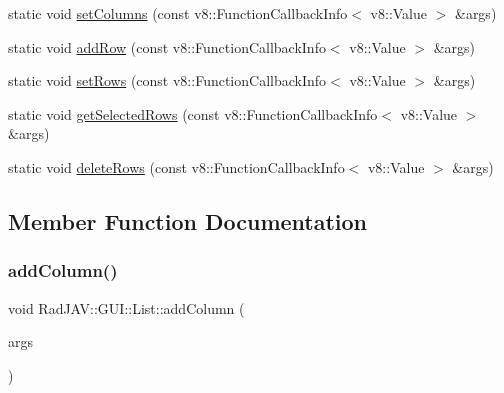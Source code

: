 \begin{DoxyCompactItemize}
\item 
static void \mbox{\hyperlink{class_rad_j_a_v_1_1_g_u_i_1_1_list_a08bfc85f458f12eee971170e09b058d3}{set\+Columns}} (const v8\+::\+Function\+Callback\+Info$<$ v8\+::\+Value $>$ \&args)
\item 
static void \mbox{\hyperlink{class_rad_j_a_v_1_1_g_u_i_1_1_list_a806e1664d1464c23473f8e208d86940f}{add\+Row}} (const v8\+::\+Function\+Callback\+Info$<$ v8\+::\+Value $>$ \&args)
\item 
static void \mbox{\hyperlink{class_rad_j_a_v_1_1_g_u_i_1_1_list_a9451ae633e7a9b6bcd540855dc2cd7a6}{set\+Rows}} (const v8\+::\+Function\+Callback\+Info$<$ v8\+::\+Value $>$ \&args)
\item 
static void \mbox{\hyperlink{class_rad_j_a_v_1_1_g_u_i_1_1_list_ab5d92eaa4a3192061741e716f2ee2423}{get\+Selected\+Rows}} (const v8\+::\+Function\+Callback\+Info$<$ v8\+::\+Value $>$ \&args)
\item 
static void \mbox{\hyperlink{class_rad_j_a_v_1_1_g_u_i_1_1_list_a04ae9b8476cf076d25e26b2c0829e340}{delete\+Rows}} (const v8\+::\+Function\+Callback\+Info$<$ v8\+::\+Value $>$ \&args)
\end{DoxyCompactItemize}


\subsection{Member Function Documentation}
\mbox{\label{class_rad_j_a_v_1_1_g_u_i_1_1_list_a2c36615fa8c05dc1c8f98be4acd5b687}} 
\subsubsection{\texorpdfstring{add\+Column()}{addColumn()}}
{\footnotesize\ttfamily void Rad\+J\+A\+V\+::\+G\+U\+I\+::\+List\+::add\+Column (\begin{DoxyParamCaption}\item[{const v8\+::\+Function\+Callback\+Info$<$ v8\+::\+Value $>$ \&}]{args }\end{DoxyParamCaption})\hspace{0.3cm}{\ttfamily [static]}}

\mbox{\label{class_rad_j_a_v_1_1_g_u_i_1_1_list_a806e1664d1464c23473f8e208d86940f}} 
